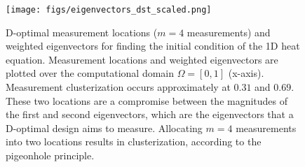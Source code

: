 \begin{figure}\label{fig:eigenvectors}
  \centering
  \texttt{[image: figs/eigenvectors\_dst\_scaled.png]}
  \caption{D-optimal measurement locations ($m=4$ measurements) and
    weighted eigenvectors for finding the initial condition of the 1D
    heat equation. Measurement locations and weighted eigenvectors are
    plotted over the computational domain $\Omega = [0, 1]$
    (x-axis). Measurement clusterization occurs approximately at
    $0.31$ and $0.69$. These two locations are a compromise between
    the magnitudes of the first and second eigenvectors, which are the
    eigenvectors that a D-optimal design aims to measure. Allocating
    $m=4$ measurements into two locations results in clusterization,
    according to the pigeonhole principle.}
  \label{fig:why}
\end{figure}
 

